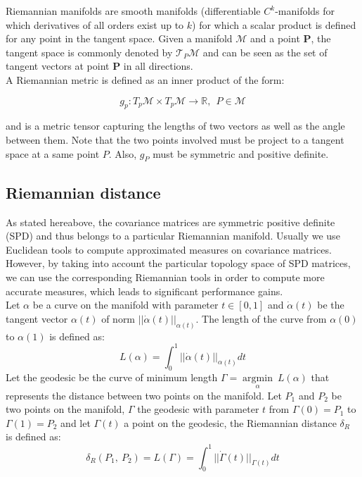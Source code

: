 \documentclass[a4paper,11pt]{report}
\begin{document}
Riemannian manifolds are smooth manifolds (differentiable $C^k$-manifolds for which derivatives of all orders exist up to $k$)
for which a scalar product is defined for any point in the tangent space. Given a manifold $\mathcal{M}$ and a point $\textbf{P}$,
the tangent space is commonly denoted by $\mathcal{T}_P \mathcal{M}$ and can be seen as the set of tangent vectors at point $\textbf{P}$ in all directions.\\
A Riemannian metric is defined as an inner product of the form:

\begin{equation}
    g_p: T_p \mathcal{M} \times T_p \mathcal{M} \rightarrow \mathbb{R}, \ \ P \in \mathcal{M}
\end{equation}

and is a metric tensor capturing the lengths of two vectors as well as the angle between them. Note that the two
points involved must be project to a tangent space at a same point $P$. Also, $g_P$ must be symmetric and positive definite.

\subsection{Riemannian distance}

As stated hereabove, the covariance matrices are symmetric positive definite (SPD) and thus belongs to a particular Riemannian manifold. Usually we use Euclidean tools to compute approximated measures on covariance matrices. However, by taking into account the particular topology space of SPD matrices, we can use the corresponding Riemannian tools in order to compute more accurate measures, which leads to significant performance gains.\\

Let $\alpha$ be a curve on the manifold with parameter $t \in [0, 1]$ and $\dot{\alpha}(t)$ be the tangent vector $\alpha (t)$ of norm $||\dot{\alpha}(t)||_{\alpha (t)}$. The length of the curve from $\alpha (0)$ to $\alpha (1)$ is defined as:
$$L(\alpha) = \int_{0}^{1} ||\dot{\alpha}(t)||_{\alpha (t)} dt$$
Let the geodesic be the curve of minimum length $\Gamma = \mathop{\mathrm{argmin}}\limits_{\alpha}\ L(\alpha)$ that represents the distance between two points on the manifold.
Let $P_1$ and $P_2$ be two points on the manifold, $\Gamma$ the geodesic with parameter $t$ from $\Gamma(0) = P_1$ to $\Gamma(1) = P_2$ and let $\Gamma(t)$ a point on the geodesic, the Riemannian distance $\delta_R$ is defined as:
$$\delta_R (P_1,\ P_2) = L(\Gamma) = \int_{0}^{1} ||\dot{\Gamma}(t)||_{\Gamma (t)} dt$$
\end{document}
